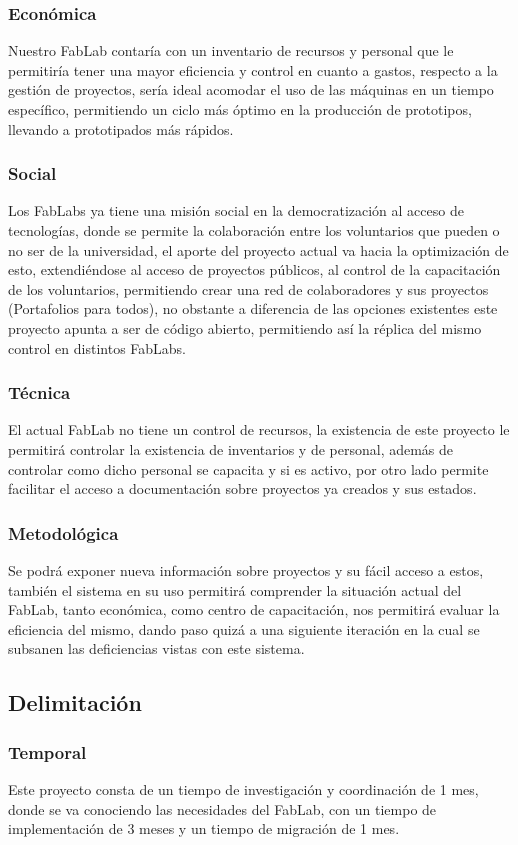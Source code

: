 \documentclass{article}
\begin{document}
\subsubsection{Económica}
Nuestro FabLab contaría con un inventario de recursos y personal que le permitiría tener una mayor eficiencia y control en cuanto a gastos, respecto a la gestión de proyectos, sería ideal acomodar el uso de las máquinas en un tiempo específico, permitiendo un ciclo más óptimo en la producción de prototipos, llevando a prototipados más rápidos.
\subsubsection{Social}
Los FabLabs ya tiene una misión social en la democratización al acceso de tecnologías, donde se permite la colaboración entre los voluntarios que pueden o no ser de la universidad, el aporte del proyecto actual va hacia la optimización de esto, extendiéndose al acceso de proyectos públicos, al control de la capacitación de los voluntarios, permitiendo crear una red de colaboradores y sus proyectos (Portafolios para todos), no obstante a diferencia de las opciones existentes este proyecto apunta a ser de código abierto, permitiendo así la réplica del mismo control en distintos FabLabs.
\subsubsection{Técnica}
El actual FabLab no tiene un control de recursos, la existencia de este proyecto le permitirá controlar la existencia de inventarios y de personal, además de controlar como dicho personal se capacita y si es activo, por otro lado permite facilitar el acceso a documentación sobre proyectos ya creados y sus estados.
\subsubsection{Metodológica}
Se podrá exponer nueva información sobre proyectos y su fácil acceso a estos, también el sistema en su uso permitirá comprender la situación actual del FabLab, tanto económica, como centro de capacitación, nos permitirá evaluar la eficiencia del mismo, dando paso quizá a una siguiente iteración en la cual se subsanen las deficiencias vistas con este sistema.
\subsection{Delimitación}
\subsubsection{Temporal}
Este proyecto consta de un tiempo de investigación y coordinación de 1 mes, donde se va conociendo las necesidades del FabLab, con un tiempo de implementación de 3 meses y un tiempo de migración de 1 mes.
\end{document}
